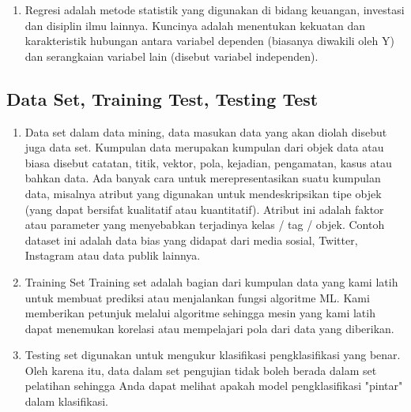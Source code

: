 \begin{enumerate}
    \item Regresi adalah metode statistik yang digunakan di bidang keuangan, investasi dan disiplin ilmu lainnya. Kuncinya adalah menentukan kekuatan dan karakteristik hubungan antara variabel dependen (biasanya diwakili oleh Y) dan serangkaian variabel lain (disebut variabel independen).
 \end{enumerate}

\subsection{Data Set, Training Test, Testing Test}
\begin{enumerate}
    \item Data set dalam data mining, data masukan data yang akan diolah disebut juga data set. Kumpulan data merupakan kumpulan dari objek data atau biasa disebut catatan, titik, vektor, pola, kejadian, pengamatan, kasus atau bahkan data. Ada banyak cara untuk merepresentasikan suatu kumpulan data, misalnya atribut yang digunakan untuk mendeskripsikan tipe objek (yang dapat bersifat kualitatif atau kuantitatif). Atribut ini adalah faktor atau parameter yang menyebabkan terjadinya kelas / tag / objek. Contoh dataset ini adalah data bias yang didapat dari media sosial, Twitter, Instagram atau data publik lainnya.
    
    \item Training Set Training set adalah bagian dari kumpulan data yang kami latih untuk membuat prediksi atau menjalankan fungsi algoritme ML. Kami memberikan petunjuk melalui algoritme sehingga mesin yang kami latih dapat menemukan korelasi atau mempelajari pola dari data yang diberikan.

    \item Testing set digunakan untuk mengukur klasifikasi pengklasifikasi yang benar. Oleh karena itu, data dalam set pengujian tidak boleh berada dalam set pelatihan sehingga Anda dapat melihat apakah model pengklasifikasi "pintar" dalam klasifikasi.
\end{enumerate}


